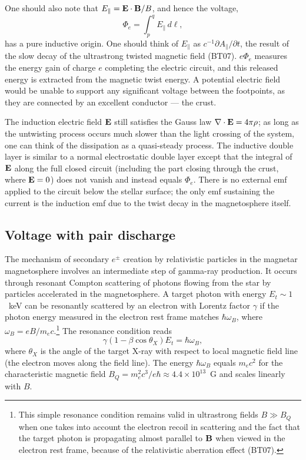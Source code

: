 One should also note that $E_\parallel={\mathbf E}\cdot{\mathbf B}/B$, and hence the voltage,
\begin{equation}
\label{eq:phi_e}
  \Phi_{e} = \int_p^{q} E_\parallel\,d\ell,
\end{equation}
has a pure inductive origin. One should think of
$E_\parallel$ as $c^{-1}\partial A_\parallel/\partial t$, the result of the slow decay
of the ultrastrong twisted magnetic field (BT07).
$e\Phi_e$ measures the energy gain of charge $e$ completing the electric circuit,
and this released energy is extracted from the magnetic twist energy.
A potential electric field would be unable to support any significant voltage
between the footpoints, as they are connected by an excellent conductor --- the crust.

The induction electric field ${\mathbf E}$ still satisfies the Gauss law $\nabla\cdot{\mathbf E}=4\pi \rho$;
as long as the untwisting process occurs much slower than the light crossing of
the system, one can think of the dissipation as a quasi-steady process. The inductive
double layer is similar to a normal electrostatic double layer except that
the integral of ${\mathbf E}$ along the full closed circuit (including the part
closing through the crust, where ${\mathbf E}=0$) does not vanish and instead equals $\Phi_e$.
There is no external emf applied to the circuit below the stellar surface; the only emf
sustaining the current is the induction emf due to the twist decay in the magnetosphere
itself.



\subsection{Voltage with pair discharge}
\label{sec:v-with-pair}

The mechanism of secondary $e^\pm$ creation by relativistic particles in the
magnetar magnetosphere  involves an intermediate step of gamma-ray production.
It occurs through resonant Compton scattering of photons flowing from the star
by particles accelerated in the magnetosphere. A target photon with energy
$E_t\sim 1$~keV can be resonantly scattered by an electron with Lorentz factor
$\gamma$ if the photon energy measured in the electron rest frame matches $\hbar\omega_B$,
where $\omega_B=eB/m_ec$.\footnote{This simple resonance condition remains
   valid in ultrastrong fields $B\gg B_Q$ when one takes into account the electron recoil
   in scattering and the fact
   that
   the target photon is propagating almost parallel to ${\mathbf B}$
   when viewed in the electron rest frame, because of the relativistic aberration effect (BT07).}
The resonance condition reads
\begin{equation}
  \label{eq:resonance-condition}
  \gamma(1 - \beta\cos\theta_X)E_t = \hbar\omega_B,
\end{equation}
where $\theta_X$ is the angle of the target X-ray with respect to local magnetic
field line (the electron moves along the field line). The energy $\hbar\omega_B$
equals $m_ec^2$ for the characteristic magnetic field
$B_Q=m_e^2c^3/e\hbar\approx 4.4\times 10^{13}$~G and scales linearly with $B$.

